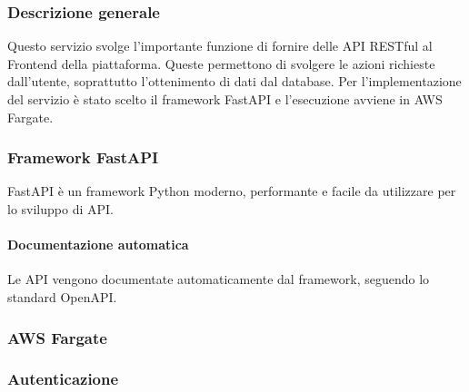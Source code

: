 \subsubsection{Descrizione generale}
Questo servizio svolge l'importante funzione di fornire delle API RESTful al Frontend della piattaforma.
Queste permettono di svolgere le azioni richieste dall'utente, soprattutto l'ottenimento di dati dal database.
Per l'implementazione del servizio è stato scelto il framework FastAPI e l'esecuzione avviene in AWS Fargate.

\subsubsection{Framework FastAPI}
FastAPI è un framework Python moderno, performante e facile da utilizzare per lo sviluppo di API.

\paragraph{Documentazione automatica}\aCapo
Le API vengono documentate automaticamente dal framework, seguendo lo standard OpenAPI.

\subsubsection{AWS Fargate}

\subsubsection{Autenticazione}
